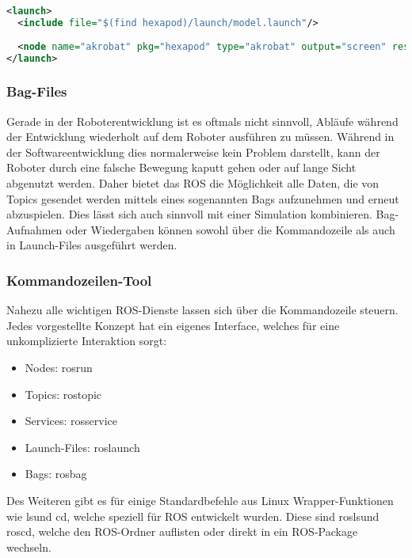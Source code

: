 \begin{lstlisting}[float=b!,label={exampleLaunchFile}, language=Xml, caption={Beispiel eines Launch-Files}]
<launch>
  <include file="$(find hexapod)/launch/model.launch"/>
  
  <node name="akrobat" pkg="hexapod" type="akrobat" output="screen" respawn="false" required="true"></node>
</launch>
\end{lstlisting}
  
\subsubsection{Bag-Files}

Gerade in der Roboterentwicklung ist es oftmals nicht sinnvoll, Abläufe während der Entwicklung wiederholt auf dem Roboter ausführen zu müssen. Während in der Softwareentwicklung dies normalerweise kein Problem darstellt, kann der Roboter durch eine falsche Bewegung kaputt gehen oder auf lange Sicht abgenutzt werden. Daher bietet das \ac{ROS} die Möglichkeit alle Daten, die von Topics gesendet werden mittels eines sogenannten Bags aufzunehmen und erneut abzuspielen. Dies lässt sich auch sinnvoll mit einer Simulation kombinieren. Bag-Aufnahmen oder Wiedergaben können sowohl über die Kommandozeile als auch in Launch-Files ausgeführt werden.

\subsubsection{Kommandozeilen-Tool}

Nahezu alle wichtigen \ac{ROS}-Dienste lassen sich über die Kommandozeile steuern. Jedes vorgestellte Konzept hat ein eigenes Interface, welches für eine unkomplizierte Interaktion sorgt:
\begin{itemize}
\item Nodes: rosrun
\item Topics: rostopic
\item Services: rosservice
\item Launch-Files: roslaunch
\item Bags: rosbag
\end{itemize}

Des Weiteren gibt es für einige Standardbefehle aus Linux Wrapper-Funktionen wie \glq ls\grq und \glq cd\grq, welche speziell für \ac{ROS} entwickelt wurden. Diese sind \glq rosls\grq und \glq roscd\grq, welche den \ac{ROS}-Ordner auflisten oder direkt in ein \ac{ROS}-Package wechseln.

